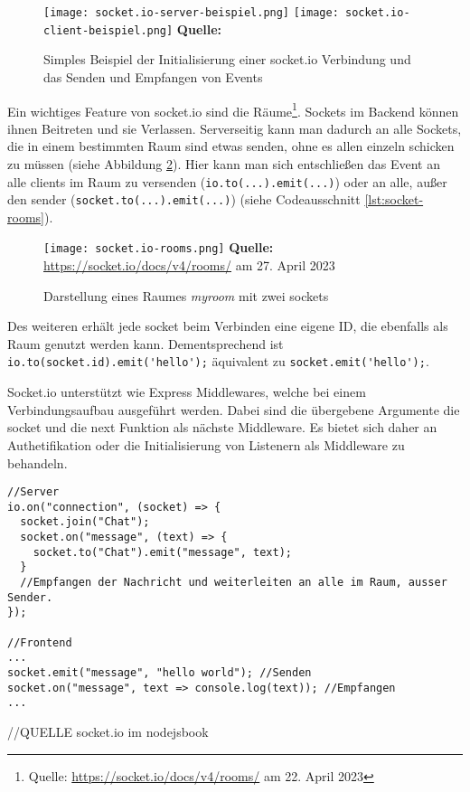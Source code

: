   \begin{figure}[ht]
\raggedleft
  \texttt{[image: socket.io-server-beispiel.png]}
  \texttt{[image: socket.io-client-beispiel.png]}
    \footnotesize\sffamily\textbf{Quelle:} \cite{socketio}
  \caption{Simples Beispiel der Initialisierung einer socket.io Verbindung und das Senden und Empfangen von Events}
  \label{fig:socket.io-beispiel}
\end{figure}

Ein wichtiges Feature von socket.io sind die Räume\footnote{Quelle: \url{https://socket.io/docs/v4/rooms/} am 22. April 2023}. Sockets im Backend können ihnen Beitreten und sie Verlassen. Serverseitig kann man dadurch an alle Sockets, die in einem bestimmten Raum sind etwas senden, ohne es allen einzeln schicken zu müssen (siehe Abbildung \ref{fig:socket.io-room}). Hier kann man sich entschließen das Event an alle clients im Raum zu versenden (\verb|io.to(...).emit(...)|) oder an alle, außer den sender (\verb|socket.to(...).emit(...)|) (siehe Codeausschnitt \ref{lst:socket-rooms}).


  \begin{figure}[ht]
  \centering
  \texttt{[image: socket.io-rooms.png]}
\raggedleft
    \footnotesize\sffamily\textbf{Quelle:} \url{https://socket.io/docs/v4/rooms/} am 27. April 2023
  \caption{Darstellung eines Raumes \textit{myroom} mit zwei sockets}
  \label{fig:socket.io-room}
\end{figure}

Des weiteren erhält jede socket beim Verbinden eine eigene ID, die ebenfalls als Raum genutzt werden kann. Dementsprechend ist \verb|io.to(socket.id).emit('hello');| äquivalent zu \verb|socket.emit('hello');|.

Socket.io unterstützt wie Express Middlewares, welche bei einem Verbindungsaufbau ausgeführt werden. Dabei sind die übergebene Argumente die socket und die next Funktion als nächste Middleware.
Es bietet sich daher an Authetifikation oder die Initialisierung von Listenern als Middleware  zu behandeln.


\begin{lstlisting}[style=codeStyle, caption={Beispiel zum Beitreten Raums und das senden eines Events in diesen Raum}, label={lst:socket-rooms}]
//Server
io.on("connection", (socket) => {
  socket.join("Chat");
  socket.on("message", (text) => {
  	socket.to("Chat").emit("message", text);
  }
  //Empfangen der Nachricht und weiterleiten an alle im Raum, ausser Sender.
});

//Frontend
...
socket.emit("message", "hello world"); //Senden
socket.on("message", text => console.log(text)); //Empfangen
...
\end{lstlisting}
//QUELLE socket.io im nodejsbook
